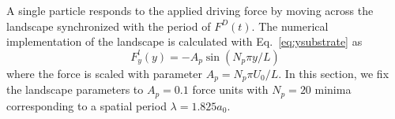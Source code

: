 \documentclass[twocolumn,preprintnumbers,amsmath,amssymb,aps,prx]{revtex4}
\begin{document}
A single particle %
responds to the applied driving force
by moving across the landscape %
synchronized with 
the period of $F^D(t)$.
%
The numerical implementation of the landscape 
is calculated with Eq.~\ref{eq:ysubstrate} as 
\begin{equation}
  \label{eq:force}
  F^l_y(y) = -A_{p} \sin{(N_p \pi y / L)} 
\end{equation}
where the force is scaled with parameter $A_{p} = N_p \pi U_0/L$.
In this section, we fix the landscape parameters
to $A_{p} = 0.1$ force units
with $N_p=20$ minima %
corresponding to a spatial period $\lambda = 1.825 a_0$.
\end{document}
